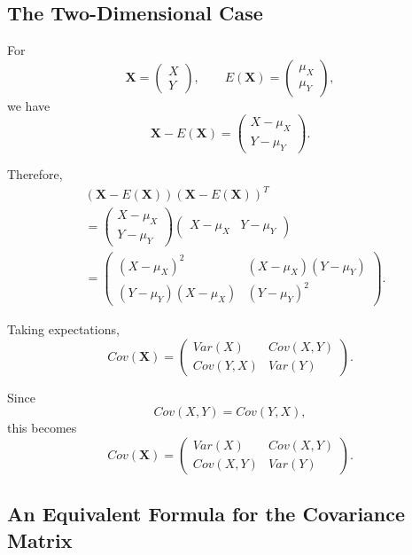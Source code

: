 \documentclass[11pt]{article}
\theoremstyle{definition}
\theoremstyle{plain}
\theoremstyle{remark}
\begin{document}
\subsection*{The Two-Dimensional Case}

For
\[
\mathbf{X}
=
\begin{pmatrix}
X\\
Y
\end{pmatrix},
\qquad
E(\mathbf{X})
=
\begin{pmatrix}
\mu_X\\
\mu_Y
\end{pmatrix},
\]
we have
\[
\mathbf{X}-E(\mathbf{X})
=
\begin{pmatrix}
X-\mu_X\\
Y-\mu_Y
\end{pmatrix}.
\]

Therefore,
\begin{align*}
&
(\mathbf{X}-E(\mathbf{X}))
(\mathbf{X}-E(\mathbf{X}))^T
\\[0.3cm]
&=
\begin{pmatrix}
X-\mu_X\\
Y-\mu_Y
\end{pmatrix}
\begin{pmatrix}
X-\mu_X & Y-\mu_Y
\end{pmatrix}
\\[0.3cm]
&=
\begin{pmatrix}
(X-\mu_X)^2
&
(X-\mu_X)(Y-\mu_Y)
\\
(Y-\mu_Y)(X-\mu_X)
&
(Y-\mu_Y)^2
\end{pmatrix}.
\end{align*}

Taking expectations,
\[
{
Cov(\mathbf{X})
=
\begin{pmatrix}
Var(X) & Cov(X,Y)\\
Cov(Y,X) & Var(Y)
\end{pmatrix}.
}
\]

Since
\[
Cov(X,Y)=Cov(Y,X),
\]
this becomes
\[
{
Cov(\mathbf{X})
=
\begin{pmatrix}
Var(X) & Cov(X,Y)\\
Cov(X,Y) & Var(Y)
\end{pmatrix}.
}
\]


\subsection*{An Equivalent Formula for the Covariance Matrix}
\end{document}
